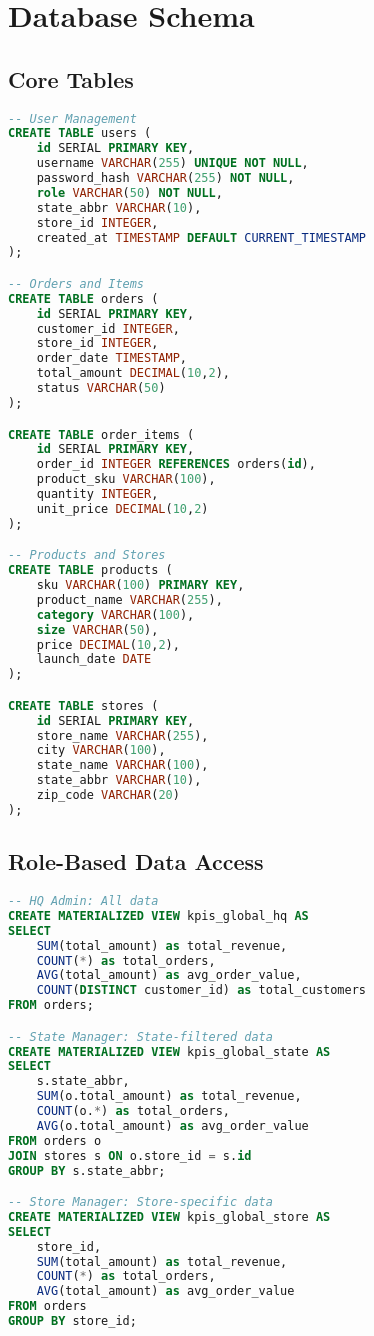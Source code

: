 \documentclass[11pt,a4paper]{article}
\begin{document}
\section{Database Schema}

\subsection{Core Tables}

\begin{lstlisting}[language=sql, caption=Core Database Tables]
-- User Management
CREATE TABLE users (
    id SERIAL PRIMARY KEY,
    username VARCHAR(255) UNIQUE NOT NULL,
    password_hash VARCHAR(255) NOT NULL,
    role VARCHAR(50) NOT NULL,
    state_abbr VARCHAR(10),
    store_id INTEGER,
    created_at TIMESTAMP DEFAULT CURRENT_TIMESTAMP
);

-- Orders and Items
CREATE TABLE orders (
    id SERIAL PRIMARY KEY,
    customer_id INTEGER,
    store_id INTEGER,
    order_date TIMESTAMP,
    total_amount DECIMAL(10,2),
    status VARCHAR(50)
);

CREATE TABLE order_items (
    id SERIAL PRIMARY KEY,
    order_id INTEGER REFERENCES orders(id),
    product_sku VARCHAR(100),
    quantity INTEGER,
    unit_price DECIMAL(10,2)
);

-- Products and Stores
CREATE TABLE products (
    sku VARCHAR(100) PRIMARY KEY,
    product_name VARCHAR(255),
    category VARCHAR(100),
    size VARCHAR(50),
    price DECIMAL(10,2),
    launch_date DATE
);

CREATE TABLE stores (
    id SERIAL PRIMARY KEY,
    store_name VARCHAR(255),
    city VARCHAR(100),
    state_name VARCHAR(100),
    state_abbr VARCHAR(10),
    zip_code VARCHAR(20)
);
\end{lstlisting}

\subsection{Role-Based Data Access}

\begin{lstlisting}[language=sql, caption=Role-Based Views]
-- HQ Admin: All data
CREATE MATERIALIZED VIEW kpis_global_hq AS
SELECT 
    SUM(total_amount) as total_revenue,
    COUNT(*) as total_orders,
    AVG(total_amount) as avg_order_value,
    COUNT(DISTINCT customer_id) as total_customers
FROM orders;

-- State Manager: State-filtered data  
CREATE MATERIALIZED VIEW kpis_global_state AS
SELECT 
    s.state_abbr,
    SUM(o.total_amount) as total_revenue,
    COUNT(o.*) as total_orders,
    AVG(o.total_amount) as avg_order_value
FROM orders o
JOIN stores s ON o.store_id = s.id
GROUP BY s.state_abbr;

-- Store Manager: Store-specific data
CREATE MATERIALIZED VIEW kpis_global_store AS  
SELECT 
    store_id,
    SUM(total_amount) as total_revenue,
    COUNT(*) as total_orders,
    AVG(total_amount) as avg_order_value
FROM orders
GROUP BY store_id;
\end{lstlisting}
\end{document}
